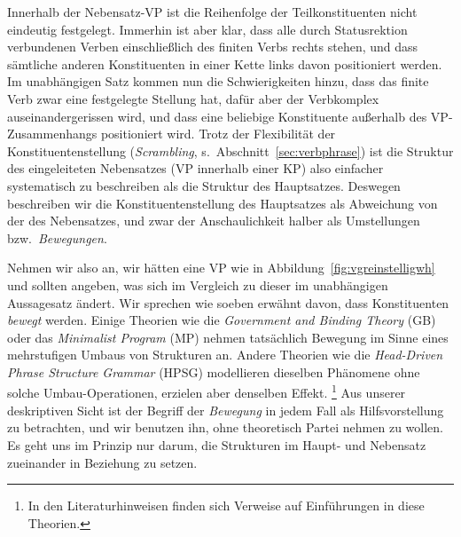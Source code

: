 \begin{exe}
  \ex\label{ex:vkv2inf}
  \begin{xlist}
  \end{xlist}
  \ex\label{ex:vkv2prt}
  \begin{xlist}
  \end{xlist}
\end{exe}


Innerhalb der Nebensatz-VP ist die Reihenfolge der Teilkonstituenten nicht eindeutig festgelegt.
Immerhin ist aber klar, dass alle durch Statusrektion verbundenen Verben einschließlich des finiten Verbs rechts stehen, und dass sämtliche anderen Konstituenten in einer Kette links davon positioniert werden.  
Im unabhängigen Satz kommen nun die Schwierigkeiten hinzu, dass das finite Verb zwar eine festgelegte Stellung hat, dafür aber der Verbkomplex auseinandergerissen wird, und dass eine beliebige Konstituente außerhalb des VP-Zusammenhangs positioniert wird.
Trotz der Flexibilität der Konstituentenstellung (\textit{Scrambling}, s.\ Abschnitt~\ref{sec:verbphrase}) ist die Struktur des eingeleiteten Nebensatzes (VP innerhalb einer KP) also einfacher systematisch zu beschreiben als die Struktur des Hauptsatzes.
Deswegen beschreiben wir die Konstituentenstellung des Hauptsatzes als Abweichung von der des Nebensatzes, und zwar der Anschaulichkeit halber als Umstellungen bzw.\ \textit{Bewegungen}.

Nehmen wir also an, wir hätten eine VP wie in Abbildung~\ref{fig:vgreinstelligwh} und sollten angeben, was sich im Vergleich zu dieser im unabhängigen Aussagesatz ändert.
Wir sprechen wie soeben erwähnt davon, dass Konstituenten \textit{bewegt} werden.
Einige Theorien wie \zB die \textit{Government and Binding Theory} (GB) oder das \textit{Minimalist Program} (MP) nehmen tatsächlich Bewegung im Sinne eines mehrstufigen Umbaus von Strukturen an.
Andere Theorien wie die \textit{Head-Driven Phrase Structure Grammar} (HPSG) modellieren dieselben Phänomene ohne solche Umbau-Operationen, erzielen aber denselben Effekt.%
\footnote{In den Literaturhinweisen finden sich Verweise auf Einführungen in diese Theorien.}
Aus unserer deskriptiven Sicht ist der Begriff der \textit{Bewegung} in jedem Fall als Hilfsvorstellung zu betrachten, und wir benutzen ihn, ohne theoretisch Partei nehmen zu wollen.
Es geht uns im Prinzip nur darum, die Strukturen im Haupt- und Nebensatz zueinander in Beziehung zu setzen.

